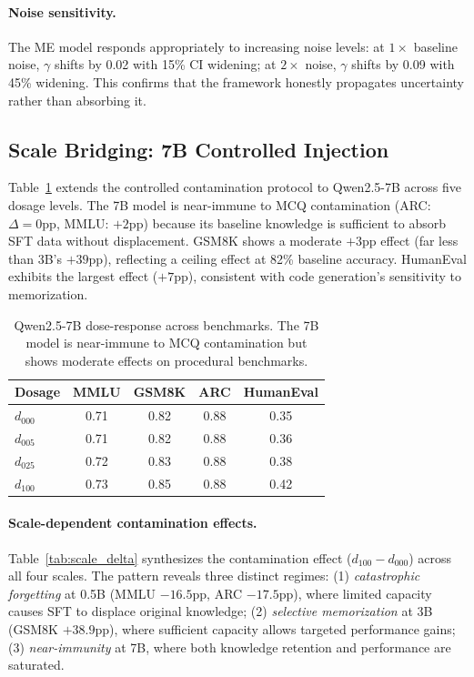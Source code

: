 \documentclass[11pt,a4paper]{article}
\begin{document}
\paragraph{Noise sensitivity.}
The ME model responds appropriately to increasing noise levels: at $1\times$ baseline noise, $\gamma$ shifts by 0.02 with 15\% CI widening; at $2\times$ noise, $\gamma$ shifts by 0.09 with 45\% widening. This confirms that the framework honestly propagates uncertainty rather than absorbing it.

\subsection{Scale Bridging: 7B Controlled Injection}
\label{sec:7b}

Table~\ref{tab:7b_dose} extends the controlled contamination protocol to Qwen2.5-7B across five dosage levels. The 7B model is near-immune to MCQ contamination (ARC: $\Delta=0$pp, MMLU: $+2$pp) because its baseline knowledge is sufficient to absorb SFT data without displacement. GSM8K shows a moderate $+3$pp effect (far less than 3B's $+39$pp), reflecting a ceiling effect at 82\% baseline accuracy. HumanEval exhibits the largest effect ($+7$pp), consistent with code generation's sensitivity to memorization.

\begin{table}[t]
\centering
\caption{Qwen2.5-7B dose-response across benchmarks. The 7B model is near-immune to MCQ contamination but shows moderate effects on procedural benchmarks.}
\label{tab:7b_dose}
\small
\begin{tabular}{lcccc}
\toprule
Dosage & MMLU & GSM8K & ARC & HumanEval \\
\midrule
$d_{000}$ & 0.71 & 0.82 & 0.88 & 0.35 \\
$d_{005}$ & 0.71 & 0.82 & 0.88 & 0.36 \\
$d_{025}$ & 0.72 & 0.83 & 0.88 & 0.38 \\
$d_{100}$ & 0.73 & 0.85 & 0.88 & 0.42 \\
\bottomrule
\end{tabular}
\end{table}

\paragraph{Scale-dependent contamination effects.}
Table~\ref{tab:scale_delta} synthesizes the contamination effect ($d_{100}-d_{000}$) across all four scales. The pattern reveals three distinct regimes: (1) \emph{catastrophic forgetting} at 0.5B (MMLU $-16.5$pp, ARC $-17.5$pp), where limited capacity causes SFT to displace original knowledge; (2) \emph{selective memorization} at 3B (GSM8K $+38.9$pp), where sufficient capacity allows targeted performance gains; (3) \emph{near-immunity} at 7B, where both knowledge retention and performance are saturated.
\end{document}
